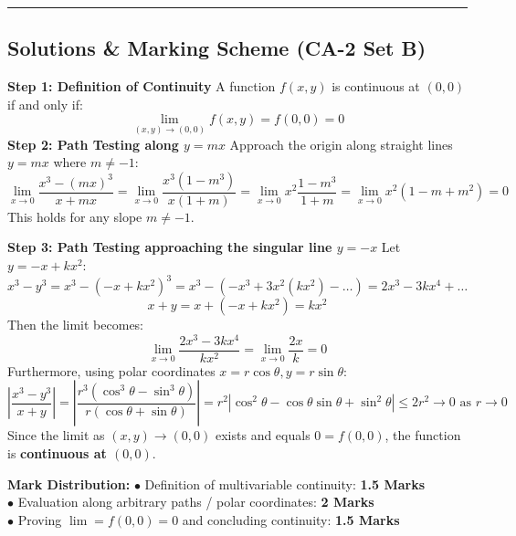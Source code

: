 \vspace{5mm}
\hrule
\vspace{5mm}

\subsection*{Solutions \& Marking Scheme (CA-2 Set B)}

\begin{solutionbox}
\textbf{Step 1: Definition of Continuity}
A function $f(x,y)$ is continuous at $(0,0)$ if and only if:
\[
\lim_{(x,y)\to (0,0)} f(x,y) = f(0,0) = 0
\]
\textbf{Step 2: Path Testing along $y = mx$}
Approach the origin along straight lines $y = mx$ where $m \neq -1$:
\[
\lim_{x\to 0} \frac{x^3 - (mx)^3}{x + mx} = \lim_{x\to 0} \frac{x^3(1 - m^3)}{x(1 + m)} = \lim_{x\to 0} x^2 \frac{1 - m^3}{1 + m} = \lim_{x\to 0} x^2 (1 - m + m^2) = 0
\]
This holds for any slope $m \neq -1$.

\textbf{Step 3: Path Testing approaching the singular line $y = -x$}
Let $y = -x + k x^2$:
\[
x^3 - y^3 = x^3 - (-x + kx^2)^3 = x^3 - (-x^3 + 3x^2(kx^2) - \dots) = 2x^3 - 3kx^4 + \dots
\]
\[
x + y = x + (-x + kx^2) = kx^2
\]
Then the limit becomes:
\[
\lim_{x\to 0} \frac{2x^3 - 3kx^4}{kx^2} = \lim_{x\to 0} \frac{2x}{k} = 0
\]
Furthermore, using polar coordinates $x = r\cos\theta, y = r\sin\theta$:
\[
\left|\frac{x^3 - y^3}{x+y}\right| = \left|\frac{r^3(\cos^3\theta - \sin^3\theta)}{r(\cos\theta + \sin\theta)}\right| = r^2 |\cos^2\theta - \cos\theta\sin\theta + \sin^2\theta| \le 2r^2 \to 0 \text{ as } r \to 0
\]
Since the limit as $(x,y)\to(0,0)$ exists and equals $0 = f(0,0)$, the function is \textbf{continuous at $(0,0)$}.

\begin{markingrubric}
\textbf{Mark Distribution:}
$\bullet$ Definition of multivariable continuity: \textbf{1.5 Marks}\\
$\bullet$ Evaluation along arbitrary paths / polar coordinates: \textbf{2 Marks}\\
$\bullet$ Proving $\lim = f(0,0) = 0$ and concluding continuity: \textbf{1.5 Marks}
\end{markingrubric}
\end{solutionbox}

